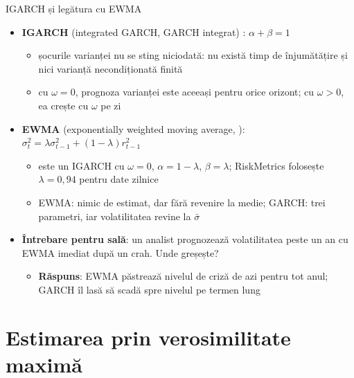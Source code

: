 \begin{frame}{IGARCH și legătura cu EWMA}
\itemsize{\small}
\begin{itemize}
    \item \textbf{IGARCH} (integrated GARCH, GARCH integrat) : $\alpha + \beta = 1$
    \begin{itemize}
        \item șocurile varianței nu se sting niciodată: nu există timp de înjumătățire și nici varianță necondiționată finită
        \item cu $\omega = 0$, prognoza varianței este aceeași pentru orice orizont; cu $\omega > 0$, ea crește cu $\omega$ pe zi
    \end{itemize}
    \item \textbf{EWMA} (exponentially weighted moving average, ): $\sigma_t^2 = \lambda\sigma_{t-1}^2 + (1 - \lambda)r_{t-1}^2$
    \begin{itemize}
        \item este un IGARCH cu $\omega = 0$, $\alpha = 1 - \lambda$, $\beta = \lambda$; RiskMetrics folosește $\lambda = 0{,}94$ pentru date zilnice
        \item EWMA: nimic de estimat, dar fără revenire la medie; GARCH: trei parametri, iar volatilitatea revine la $\bar\sigma$
    \end{itemize}
    \item \textbf{Întrebare pentru sală}: un analist prognozează volatilitatea peste un an cu EWMA imediat după un crah. Unde greșește?
    \begin{itemize}
        \item \textbf{Răspuns}: EWMA păstrează nivelul de criză de azi pentru tot anul; GARCH îl lasă să scadă spre nivelul pe termen lung
    \end{itemize}
\end{itemize}
\end{frame}


\section{Estimarea prin verosimilitate maximă}

